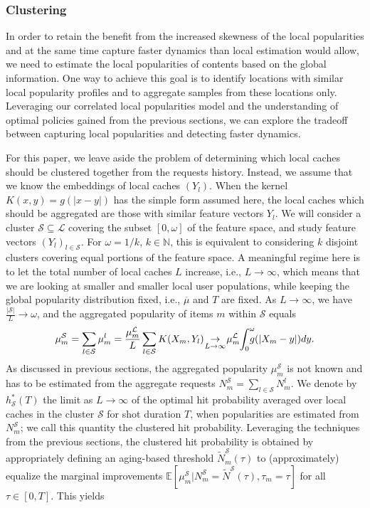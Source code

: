 \documentclass[10pt, conference, letterpaper]{IEEEtran}
\newcommand{\mean}[1]{\mathbb{E}\!\left[#1\right]}
\def\N{\mathbb{N}}
\begin{document}
\subsubsection{Clustering}
In order to retain the benefit from the increased skewness of the local popularities and at the same time  capture faster dynamics than local estimation would allow, we need to estimate the local popularities of contents based on the global information. One way to achieve this goal is to identify locations with similar local popularity profiles and to aggregate samples from these locations only. Leveraging our correlated local popularities model and the understanding of optimal policies gained from the previous sections, we can explore the tradeoff between capturing local popularities and detecting faster dynamics.

For this paper, we leave aside the problem of determining which local caches should be clustered together from the requests history. Instead, we assume that we know the embeddings of local caches $(Y_l)$. When the kernel $K(x,y)=g(|x-y|)$ has the simple form assumed here, the local caches which should be aggregated are those with similar feature vectors $Y_l$. 
We will consider a cluster $\mathcal S\subseteq\mathcal L$ covering the subset $[0,\omega]$ of the feature space, and study feature vectors $(Y_l)_{l\in\mathcal S}$.
For $\omega=1/k$, $k\in\N$, this is equivalent to considering $k$ disjoint clusters covering equal portions of the feature space.
 A meaningful regime here is to let the total number of local caches $L$ increase, i.e., $L\to\infty$, which means that we are looking at smaller and smaller local user populations, while keeping the global popularity distribution fixed, i.e., $\overline\mu$ and $T$ are fixed. As $L\to\infty$, we have $\frac{|\mathcal S|}{L}\to\omega$, and the aggregated popularity of items $m$ within $\mathcal S$ equals
\[
\mu_m^\mathcal S=\sum_{l\in\mathcal S}\mu_m^l=\frac{\mu_m^\mathcal L}{L}\sum_{l\in\mathcal S}K(X_m,Y_l)\hspace{-0.03in}\underset{L\to\infty}\to\hspace{-0.03in}\mu_m^\mathcal L\hspace{-0.03in}\int_0^\omega\hspace{-0.1in}g(|X_m-y|)dy.
\]
As discussed in previous sections, the aggregated popularity $\mu_m^\mathcal S$ is not known and has to be estimated from the aggregate requests $N_m^\mathcal S=\sum_{l\in\mathcal S}N_m^l$. We denote by $h_\mathcal S^*(T)$ the limit as $L\to\infty$ of the optimal hit probability averaged over local caches in the cluster $\mathcal S$ for shot duration $T$, when popularities are estimated from $N_m^\mathcal S$; we call this quantity the clustered hit probability. Leveraging the techniques from the previous sections, the clustered hit probability is obtained by appropriately defining an aging-based threshold $\widetilde N_m^\mathcal S(\tau)$ to (approximately) equalize the marginal improvements $\mean{\mu_m^\mathcal S\big|N_m^\mathcal S=\widetilde N^\mathcal S(\tau),\tau_m=\tau}$ for all $\tau\in[0,T]$. This yields
\end{document}
